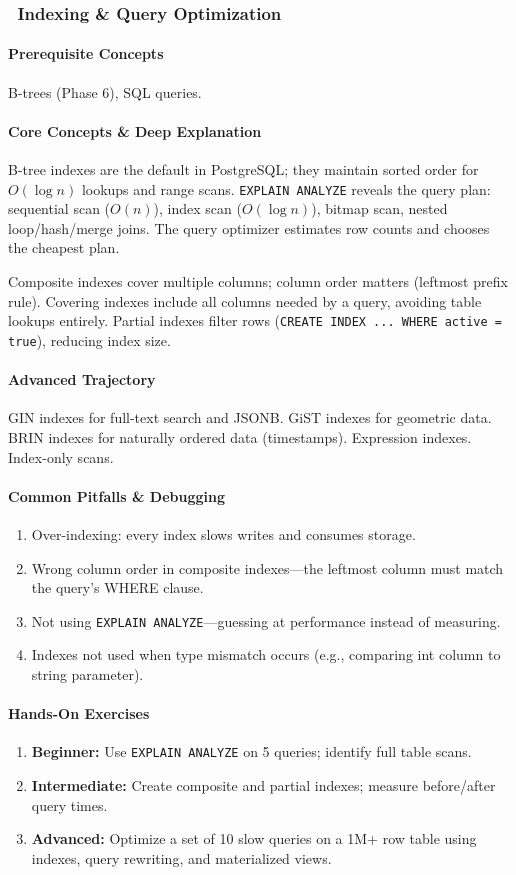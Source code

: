 \documentclass[11pt, a4paper, oneside]{report}
\newcommand{\mustmaster}[1]{\subsubsection{\texorpdfstring{\fcolorbox{blue!40!black}{blue!8}{\footnotesize\bfseries\color{blue!40!black} MUST MASTER}~#1}{#1}}}
\begin{document}
\mustmaster{Indexing \& Query Optimization}

\paragraph{Prerequisite Concepts} B-trees (Phase 6), SQL queries.

\paragraph{Core Concepts \& Deep Explanation} B-tree indexes are the default in PostgreSQL; they maintain sorted order for $O(\log n)$ lookups and range scans. \texttt{EXPLAIN ANALYZE} reveals the query plan: sequential scan ($O(n)$), index scan ($O(\log n)$), bitmap scan, nested loop/hash/merge joins. The query optimizer estimates row counts and chooses the cheapest plan.

Composite indexes cover multiple columns; column order matters (leftmost prefix rule). Covering indexes include all columns needed by a query, avoiding table lookups entirely. Partial indexes filter rows (\texttt{CREATE INDEX ... WHERE active = true}), reducing index size.

\paragraph{Advanced Trajectory} GIN indexes for full-text search and JSONB. GiST indexes for geometric data. BRIN indexes for naturally ordered data (timestamps). Expression indexes. Index-only scans.

\paragraph{Common Pitfalls \& Debugging}
\begin{enumerate}[leftmargin=*]
\item Over-indexing: every index slows writes and consumes storage.
\item Wrong column order in composite indexes---the leftmost column must match the query's WHERE clause.
\item Not using \texttt{EXPLAIN ANALYZE}---guessing at performance instead of measuring.
\item Indexes not used when type mismatch occurs (e.g., comparing int column to string parameter).
\end{enumerate}

\paragraph{Hands-On Exercises}
\begin{enumerate}[leftmargin=*]
\item \textbf{Beginner:} Use \texttt{EXPLAIN ANALYZE} on 5 queries; identify full table scans.
\item \textbf{Intermediate:} Create composite and partial indexes; measure before/after query times.
\item \textbf{Advanced:} Optimize a set of 10 slow queries on a 1M+ row table using indexes, query rewriting, and materialized views.
\end{enumerate}
\end{document}
